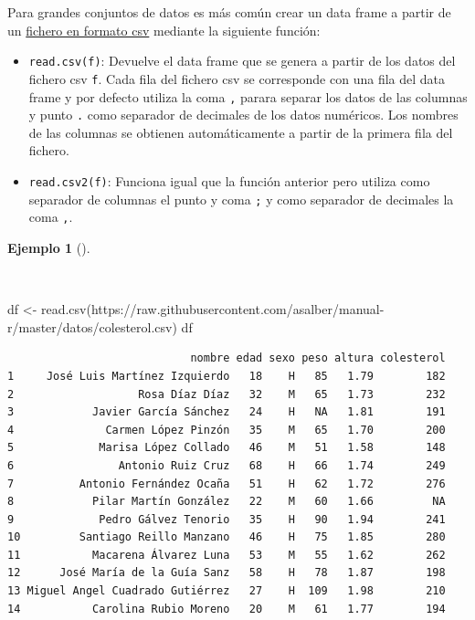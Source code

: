 \documentclass[
  a4paper,
]{scrreport}
\newenvironment{Shaded}{\begin{snugshade}}{\end{snugshade}}
\newcommand{\FunctionTok}[1]{\textcolor[rgb]{0.28,0.35,0.67}{#1}}
\newcommand{\NormalTok}[1]{\textcolor[rgb]{0.00,0.23,0.31}{#1}}
\newcommand{\OtherTok}[1]{\textcolor[rgb]{0.00,0.23,0.31}{#1}}
\newcommand{\StringTok}[1]{\textcolor[rgb]{0.13,0.47,0.30}{#1}}
\providecommand{\tightlist}{%
  \setlength{\itemsep}{0pt}\setlength{\parskip}{0pt}}\usepackage{longtable,booktabs,array}
\theoremstyle{definition}
\theoremstyle{definition}
\newtheorem{example}{Ejemplo}[chapter]
\theoremstyle{remark}
\begin{document}
Para grandes conjuntos de datos es más común crear un data frame a
partir de un
\href{https://es.wikipedia.org/wiki/Valores_separados_por_comas}{fichero
en formato csv} mediante la siguiente función:

\begin{itemize}
\tightlist
\item
  \texttt{read.csv(f)}: Devuelve el data frame que se genera a partir de
  los datos del fichero csv \texttt{f}. Cada fila del fichero csv se
  corresponde con una fila del data frame y por defecto utiliza la coma
  \texttt{,} parara separar los datos de las columnas y punto \texttt{.}
  como separador de decimales de los datos numéricos. Los nombres de las
  columnas se obtienen automáticamente a partir de la primera fila del
  fichero.
\item
  \texttt{read.csv2(f)}: Funciona igual que la función anterior pero
  utiliza como separador de columnas el punto y coma \texttt{;} y como
  separador de decimales la coma \texttt{,}.
\end{itemize}

\begin{example}[]\protect\hypertarget{exm-creacion-data-frame-csv}{}\label{exm-creacion-data-frame-csv}

~

\begin{Shaded}
\begin{Highlighting}[]
\NormalTok{df }\OtherTok{\textless{}{-}} \FunctionTok{read.csv}\NormalTok{(}\StringTok{\textquotesingle{}https://raw.githubusercontent.com/asalber/manual{-}r/master/datos/colesterol.csv\textquotesingle{}}\NormalTok{)}
\NormalTok{df}
\end{Highlighting}
\end{Shaded}

\begin{verbatim}
                            nombre edad sexo peso altura colesterol
1     José Luis Martínez Izquierdo   18    H   85   1.79        182
2                   Rosa Díaz Díaz   32    M   65   1.73        232
3            Javier García Sánchez   24    H   NA   1.81        191
4              Carmen López Pinzón   35    M   65   1.70        200
5             Marisa López Collado   46    M   51   1.58        148
6                Antonio Ruiz Cruz   68    H   66   1.74        249
7          Antonio Fernández Ocaña   51    H   62   1.72        276
8            Pilar Martín González   22    M   60   1.66         NA
9             Pedro Gálvez Tenorio   35    H   90   1.94        241
10         Santiago Reillo Manzano   46    H   75   1.85        280
11           Macarena Álvarez Luna   53    M   55   1.62        262
12      José María de la Guía Sanz   58    H   78   1.87        198
13 Miguel Angel Cuadrado Gutiérrez   27    H  109   1.98        210
14           Carolina Rubio Moreno   20    M   61   1.77        194
\end{verbatim}

\end{example}
\end{document}
